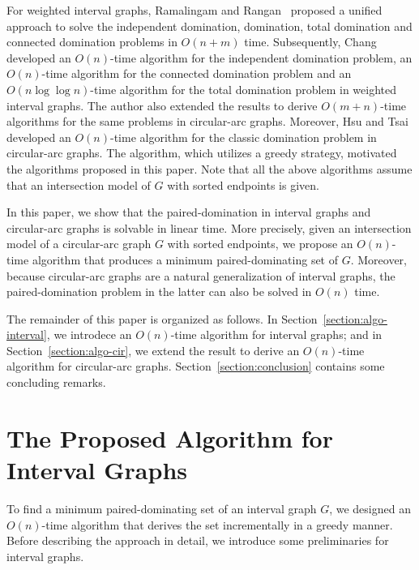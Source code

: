 \documentclass[12pt]{article}
\begin{document}
For weighted interval graphs, Ramalingam and
Rangan~\cite{Ramalingam88} proposed a unified approach to solve
the independent domination, domination, total domination and
connected domination problems in $O(n+m)$ time. Subsequently,
Chang~\cite{Chang98} developed an $O(n)$-time algorithm for the
independent domination problem, an $O(n)$-time algorithm for the
connected domination problem and an $O(n \log \log n)$-time
algorithm for the total domination problem in weighted interval
graphs. The author also extended the results to derive
$O(m+n)$-time algorithms for the same problems in circular-arc
graphs. Moreover, Hsu and Tsai~\cite{HT91} developed an
$O(n)$-time algorithm for the classic domination problem in
circular-arc graphs. The algorithm, which utilizes a greedy
strategy, motivated the algorithms proposed in this paper. Note
that all the above algorithms assume that an intersection model of
$G$ with sorted endpoints is given.

In this paper, we show that the paired-domination in interval
graphs and circular-arc graphs is solvable in linear time. More
precisely, given an intersection model of a circular-arc graph $G$
with sorted endpoints, we propose an $O(n)$-time algorithm that
produces a minimum paired-dominating set of $G$. Moreover, because
circular-arc graphs are a natural generalization of interval
graphs, the paired-domination problem in the latter can also be
solved in $O(n)$ time.

The remainder of this paper is organized as follows. In
Section~\ref{section:algo-interval}, we introdece an $O(n)$-time
algorithm for interval graphs; and in
Section~\ref{section:algo-cir}, we extend the result to derive an
$O(n)$-time algorithm for circular-arc graphs.
Section~\ref{section:conclusion} contains some concluding remarks.


\section{The Proposed Algorithm for Interval Graphs
                              \label{section:algo-interval}}
To find a minimum paired-dominating set of an interval graph $G$,
we designed an $O(n)$-time algorithm that derives the set
incrementally in a greedy manner. Before describing the approach
in detail, we introduce some preliminaries for interval graphs.
\end{document}
